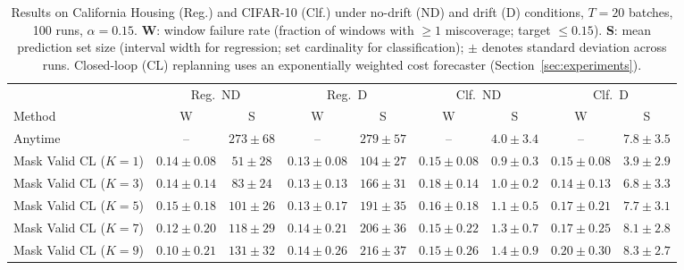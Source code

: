 \documentclass{uai2026} %
\newcommand{\1}{\mathbf{1}}
\begin{document}
\begin{table}[htbp]
  \centering
  \caption{%
    Results on California Housing (Reg.) and CIFAR-10 (Clf.) under no-drift (ND) and drift (D) conditions, $T = 20$ batches, 100 runs, $\alpha = 0.15$.
    \textbf{W}: window failure rate (fraction of windows with $\ge 1$ miscoverage; target $\le 0.15$).
    \textbf{S}: mean prediction set size (interval width for regression; set cardinality for classification); $\pm$ denotes standard deviation across runs.
    Closed-loop (CL) replanning uses an exponentially weighted cost forecaster (Section~\ref{sec:experiments}).
  }
  \label{tab:results}
  \small
  \begin{tabular}{@{}l|cc|cc|cc|cc@{}}
    \toprule
    & \multicolumn{2}{c|}{Reg.\ ND}
    & \multicolumn{2}{c|}{Reg.\ D}
    & \multicolumn{2}{c|}{Clf.\ ND}
    & \multicolumn{2}{c}{Clf.\ D}                                                                                                                       \\
    \cmidrule(lr){2-3}\cmidrule(lr){4-5}\cmidrule(lr){6-7}\cmidrule(lr){8-9}
    Method                        & W                             & S            & W               & S            & W               & S             & W               & S             \\
    \midrule
    Anytime                       & --                            & $273{\pm}68$ & --              & $279{\pm}57$ & --              & $4.0{\pm}3.4$ & --              & $7.8{\pm}3.5$ \\
    Mask Valid CL ($K{=}1$) & $0.14{\pm}0.08$               & $51{\pm}28$  & $0.13{\pm}0.08$ & $104{\pm}27$ & $0.15{\pm}0.08$ & $0.9{\pm}0.3$ & $0.15{\pm}0.08$ & $3.9{\pm}2.9$ \\
    Mask Valid CL ($K{=}3$) & $0.14{\pm}0.14$               & $83{\pm}24$  & $0.13{\pm}0.13$ & $166{\pm}31$ & $0.18{\pm}0.14$ & $1.0{\pm}0.2$ & $0.14{\pm}0.13$ & $6.8{\pm}3.3$ \\
    Mask Valid CL ($K{=}5$) & $0.15{\pm}0.18$               & $101{\pm}26$ & $0.13{\pm}0.17$ & $191{\pm}35$ & $0.16{\pm}0.18$ & $1.1{\pm}0.5$ & $0.17{\pm}0.21$ & $7.7{\pm}3.1$ \\
    Mask Valid CL ($K{=}7$) & $0.12{\pm}0.20$               & $118{\pm}29$ & $0.14{\pm}0.21$ & $206{\pm}36$ & $0.15{\pm}0.22$ & $1.3{\pm}0.7$ & $0.17{\pm}0.25$ & $8.1{\pm}2.8$ \\
    Mask Valid CL ($K{=}9$) & $0.10{\pm}0.21$               & $131{\pm}32$ & $0.14{\pm}0.26$ & $216{\pm}37$ & $0.15{\pm}0.26$ & $1.4{\pm}0.9$ & $0.20{\pm}0.30$ & $8.3{\pm}2.7$ \\
    \bottomrule
  \end{tabular}
\end{table}
\end{document}
